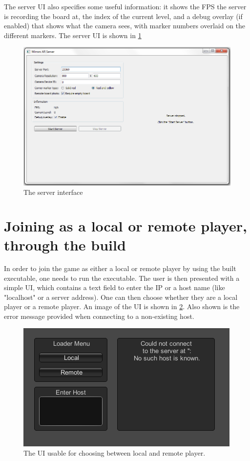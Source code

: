 \documentclass{report}
\begin{document}
	The server UI also specifies some useful information: it shows the FPS the
	server is recording the board at, the index of the current level, and a debug
	overlay (if enabled) that shows what the camera sees, with marker numbers
	overlaid on the different markers. The server UI is shown in \ref{fig:serverui}
	\begin{figure}[!ht]
	    \centering
	    \includegraphics[scale = 0.5]{MirrorServerUI}
	    \caption{The server interface}
	    \label{fig:serverui}
	\end{figure}
	
\section*{Joining as a local or remote player, through the build}
	In order to join the game as either a local or remote player by using the built
	executable, one needs to run the executable. The user is then presented with a
	simple UI, which contains a text field to enter the IP or a host name (like
	"localhost" or a server address). One can then choose whether they are a local player or a remote
	player. An image of the UI is shown in \ref{fig:remotelocalui}. Also shown is the
	error message provided when connecting to a non-existing
	host.
	\begin{figure}[!ht]
	    \centering
	    \includegraphics[scale = 0.6]{RemoteLocalUI}
	    \caption{The UI usable for choosing between local and remote player.}
	    \label{fig:remotelocalui}
	\end{figure}
	
\end{document}
